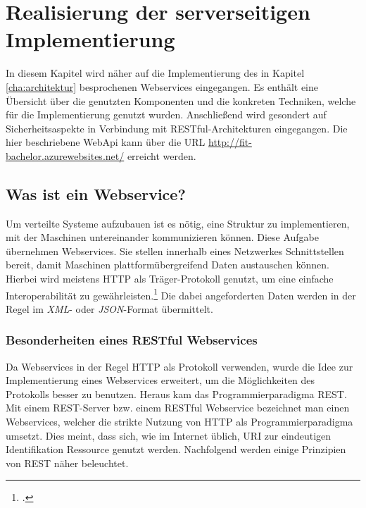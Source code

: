 \chapter{Realisierung der serverseitigen Implementierung}
\label{cha:server-impl}
In diesem Kapitel wird näher auf die Implementierung des in Kapitel \ref{cha:architektur} besprochenen Webservices eingegangen. Es enthält eine Übersicht über die genutzten Komponenten und die konkreten Techniken, welche für die Implementierung genutzt wurden. Anschließend wird gesondert auf Sicherheitsaspekte in Verbindung mit \ac{REST}ful-Architekturen eingegangen. Die hier beschriebene WebApi kann über die \ac{URL} \href{http://fit-bachelor.azurewebsites.net/}{http://fit-bachelor.azurewebsites.net/} erreicht werden. 
\section{Was ist ein Webservice?}
\label{sec:definition-webservice}
Um verteilte Systeme aufzubauen ist es nötig, eine Struktur zu implementieren, mit der Maschinen untereinander kommunizieren können. Diese Aufgabe übernehmen Webservices. Sie stellen innerhalb eines Netzwerkes Schnittstellen bereit, damit Maschinen plattformübergreifend Daten austauschen können. Hierbei wird meistens \ac{HTTP} als Träger-Protokoll genutzt, um eine einfache Interoperabilität zu gewährleisten.\footcite{Definition-Webservice} Die dabei angeforderten Daten werden in der Regel im \textit{\ac{XML}}- oder \textit{\ac{JSON}}-Format übermittelt. 
\subsection{Besonderheiten eines RESTful Webservices}
\label{sec:definition-rest}
Da Webservices in der Regel \ac{HTTP} als Protokoll verwenden, wurde die Idee zur Implementierung eines Webservices erweitert, um die Möglichkeiten des Protokolls besser zu benutzen. Heraus kam das Programmierparadigma \ac{REST}. Mit einem \ac{REST}-Server bzw. einem RESTful Webservice bezeichnet man einen Webservices, welcher die strikte Nutzung von HTTP als Programmierparadigma umsetzt.  Dies meint, dass sich, wie im Internet üblich, \ac{URI} zur eindeutigen Identifikation Ressource genutzt werden. Nachfolgend werden einige Prinzipien von \ac{REST} näher beleuchtet.

